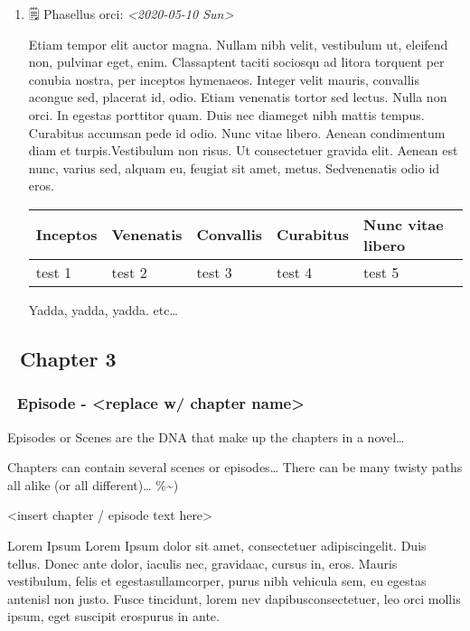 \documentclass[11pt]{article}
\begin{document}
\begin{enumerate}
\item 🗒 Phasellus orci: \textit{<2020-05-10 Sun>}
\label{sec:orga6139ce}

Etiam tempor elit auctor magna. Nullam nibh velit, vestibulum ut, eleifend non, pulvinar eget, enim. Classaptent taciti sociosqu ad litora torquent per conubia nostra, per inceptos hymenaeos. Integer velit mauris, convallis acongue sed, placerat id, odio. Etiam venenatis tortor sed lectus. Nulla non orci. In egestas porttitor quam. Duis nec diameget nibh mattis tempus. Curabitus accumsan pede id odio. Nunc vitae libero. Aenean condimentum diam et turpis.Vestibulum non risus. Ut consectetuer gravida elit. Aenean est nunc, varius sed, alquam eu, feugiat sit amet, metus. Sedvenenatis odio id eros.

\begin{center}
\begin{tabular}{lllll}
\hline
Inceptos & Venenatis & Convallis & Curabitus & Nunc vitae libero\\
\hline
test 1 & test 2 & test 3 & test 4 & test 5\\
\hline
\end{tabular}
\end{center}

Yadda, yadda, yadda. etc\ldots{}
\end{enumerate}



\subsection{🔖 Chapter 3}
\label{sec:org5f6d88e}

\subsubsection{📄 Episode - <replace w/ chapter name>}
\label{sec:orgf482ffb}
Episodes or Scenes are the DNA that make up the chapters in a novel\ldots{}  

Chapters can contain several scenes or episodes\ldots{} There can be many twisty paths all alike (or all different)\ldots{} \%\textasciitilde{})

<insert chapter / episode text here>

Lorem Ipsum Lorem Ipsum dolor sit amet, consectetuer adipiscingelit. Duis tellus. Donec ante dolor, iaculis nec, gravidaac, cursus in, eros. Mauris vestibulum, felis et egestasullamcorper, purus nibh vehicula sem, eu egestas antenisl non justo. Fusce tincidunt, lorem nev dapibusconsectetuer, leo orci mollis ipsum, eget suscipit erospurus in ante. 
\end{document}
